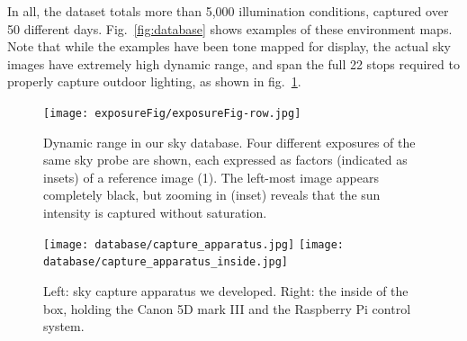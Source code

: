 In all, the dataset totals more than 5,000 illumination conditions, captured over 50 different days. Fig.~\ref{fig:database} shows examples of these environment maps. Note that while the examples have been tone mapped for display, the actual sky images have extremely high dynamic range, and span the full 22 stops required to properly capture outdoor lighting, as shown in fig.~\ref{fig:exposure}.

\begin{figure}
\centering
\texttt{[image: exposureFig/exposureFig-row.jpg]}
\caption[Sky Database]{Dynamic range in our sky database. Four different exposures of the same sky probe are shown, each expressed as factors (indicated as insets) of a reference image (1). The left-most image appears completely black, but zooming in (inset) reveals that the sun intensity is captured without saturation.}
\label{fig:exposure}
\end{figure}


\begin{figure}
\centering
\texttt{[image: database/capture\_apparatus.jpg]}
\texttt{[image: database/capture\_apparatus\_inside.jpg]}
\caption[Database capture apparatus]{Left: sky capture apparatus we developed. Right: the inside of the box, holding the Canon 5D mark III and the Raspberry Pi control system.}
\label{fig:capture-apparatus}
\end{figure}


